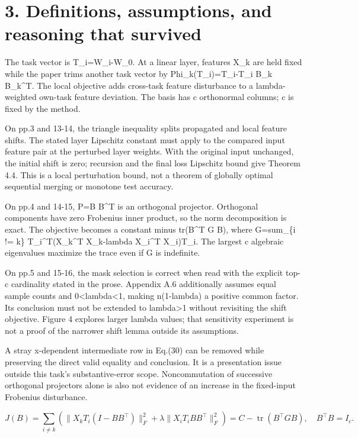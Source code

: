 \documentclass[10pt]{article}
\begin{document}
\section*{3. Definitions, assumptions, and reasoning that survived}
The task vector is T\_i=W\_i-W\_0. At a linear layer, features X\_k are held fixed while the paper trims another task vector by Phi\_k(T\_i)=T\_i-T\_i B\_k B\_k\textasciicircum{}T. The local objective adds cross-task feature disturbance to a lambda-weighted own-task feature deviation. The basis has c orthonormal columns; c is fixed by the method.\par
On pp.3 and 13-14, the triangle inequality splits propagated and local feature shifts. The stated layer Lipschitz constant must apply to the compared input feature pair at the perturbed layer weights. With the original input unchanged, the initial shift is zero; recursion and the final loss Lipschitz bound give Theorem 4.4. This is a local perturbation bound, not a theorem of globally optimal sequential merging or monotone test accuracy.\par
On pp.4 and 14-15, P=B B\textasciicircum{}T is an orthogonal projector. Orthogonal components have zero Frobenius inner product, so the norm decomposition is exact. The objective becomes a constant minus tr(B\textasciicircum{}T G B), where G=sum\_\{i != k\} T\_i\textasciicircum{}T(X\_k\textasciicircum{}T X\_k-lambda X\_i\textasciicircum{}T X\_i)T\_i. The largest c algebraic eigenvalues maximize the trace even if G is indefinite.\par
On pp.5 and 15-16, the mask selection is correct when read with the explicit top-c cardinality stated in the prose. Appendix A.6 additionally assumes equal sample counts and 0<lambda<1, making n(1-lambda) a positive common factor. Its conclusion must not be extended to lambda>1 without revisiting the shift objective. Figure 4 explores larger lambda values; that sensitivity experiment is not a proof of the narrower shift lemma outside its assumptions.\par
A stray x-dependent intermediate row in Eq.(30) can be removed while preserving the direct valid equality and conclusion. It is a presentation issue outside this task’s substantive-error scope. Noncommutation of successive orthogonal projectors alone is also not evidence of an increase in the fixed-input Frobenius disturbance.\par
\[J(B)=\sum_{i\ne k}\left(\|X_kT_i(I-BB^\top)\|_F^2+\lambda\|X_iT_iBB^\top\|_F^2\right)=C-\operatorname{tr}(B^\top GB),\quad B^\top B=I_c.\]\par
\end{document}
